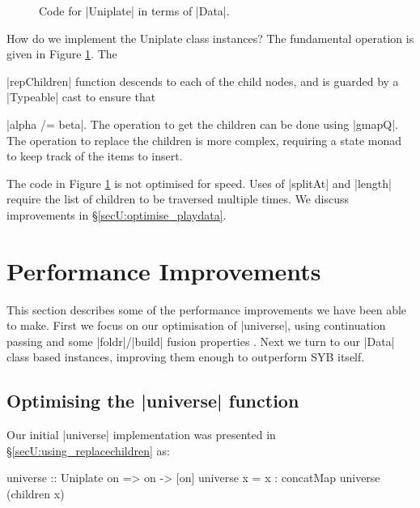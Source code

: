 \begin{figure}
\ignore{}
\caption{Code for |Uniplate| in terms of |Data|.}
\label{figU:playdata}
\end{figure}

How do we implement the Uniplate class instances? The fundamental operation is given in Figure \ref{figU:playdata}. The \ignore|repChildren| function descends to each of the child nodes, and is guarded by a |Typeable| cast to ensure that \ignore|alpha /= beta|. The operation to get the children can be done using |gmapQ|. The operation to replace the children is more complex, requiring a state monad to keep track of the items to insert.

The code in Figure \ref{figU:playdata} is not optimised for speed. Uses of |splitAt| and |length| require the list of children to be traversed multiple times. We discuss improvements in \S\ref{secU:optimise_playdata}.


\section{Performance Improvements}
\label{secU:performance}

This section describes some of the performance improvements we have been able to make. First we focus on our optimisation of |universe|, using continuation passing and some |foldr|/|build| fusion properties \cite{spj:rules}. Next we turn to our |Data| class based instances, improving them enough to outperform SYB itself.

\subsection{Optimising the |universe| function}
\label{secU:optimise_everything}

Our initial |universe| implementation was presented in \S\ref{secU:using_replacechildren} as:

\begin{code}
universe :: Uniplate on => on -> [on]
universe x = x : concatMap universe (children x)
\end{code}

